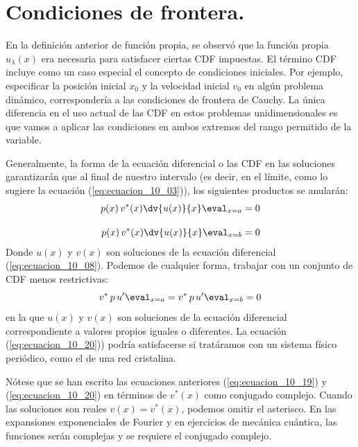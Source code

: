 \section{Condiciones de frontera.}
En la definición anterior de función propia, se observó que la función propia $u_{\lambda} (x)$ era necesaria para satisfacer ciertas CDF impuestas. El término CDF incluye como un caso especial el concepto de condiciones iniciales. Por ejemplo, especificar la posición inicial $x_{0}$ y la velocidad inicial $v_{0}$ en algún problema dinámico, correspondería a las condiciones de frontera de Cauchy. La única diferencia en el uso actual de las CDF en estos problemas unidimensionales es que vamos a aplicar las condiciones en ambos extremos del rango permitido de la variable.
\par
Generalmente, la forma de la ecuación diferencial o las CDF en las soluciones garantizarán que al final de nuestro intervalo (es decir, en el límite, como lo sugiere la ecuación (\ref{eq:ecuacion_10_03})), los siguientes productos se anularán:
\begin{align}
\begin{aligned}
p(x) \, v^{*}(x) \dv{u(x)}{x} \eval_{x = a} = 0 \\[1em]
p(x) \, v^{*}(x) \dv{u(x)}{x} \eval_{x = b} = 0
\label{eq:ecuacion_10_19}
\end{aligned}
\end{align}
Donde $u(x)$ y $v(x)$ son soluciones de la ecuación diferencial (\ref{eq:ecuacion_10_08}). Podemos de cualquier forma, trabajar con un conjunto de CDF menos restrictivas:
\begin{equation}
v^{*} \, p \, u^{\prime} \eval_{x = a} = v^{*} \, p \, u^{\prime} \eval_{x = b} = 0
\label{eq:ecuacion_10_20}
\end{equation}
en la que $u(x)$ y $v(x)$ son soluciones de la ecuación diferencial correspondiente a valores propios iguales o diferentes. La ecuación (\ref{eq:ecuacion_10_20})) podría satisfacerse si tratáramos con un sistema físico periódico, como el de una red cristalina.
\par
Nótese que se han escrito las ecuaciones anteriores  (\ref{eq:ecuacion_10_19}) y (\ref{eq:ecuacion_10_20}) en términos de $v^{*}(x)$ como conjugado complejo. Cuando las soluciones son reales $v(x) = v^{*}(x)$, podemos omitir el asterisco. En las expansiones exponenciales de Fourier y en ejercicios de mecánica cuántica, las funciones serán complejas y se requiere el conjugado complejo.
\newpage
